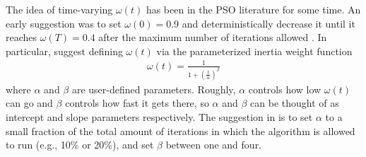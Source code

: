 \documentclass[12pt]{article}
\begin{document}
The idea of time-varying $\omega(t)$ has been in the PSO literature for some time. An early suggestion was to set $\omega(0)=0.9$ and deterministically decrease it until it reaches $\omega(T)=0.4$ after the maximum number of iterations allowed \citep{eberhart2000comparing}. In particular, \citet{tuppadung2011comparing} suggest defining $\omega(t)$ via the parameterized inertia weight function
\begin{align}\label{eq:inertiafun}
\omega(t) = \frac{1}{1 + \left(\frac{t}{\alpha}\right)^{\beta}}
\end{align}
where $\alpha$ and $\beta$ are user-defined parameters. Roughly, $\alpha$ controls how low $\omega(t)$ can go and $\beta$ controls how fast it gets there, so $\alpha$ and $\beta$ can be thought of as intercept and slope parameters respectively. The suggestion in \citet{tuppadung2011comparing} is to set $\alpha$ to a small fraction of the total amount of iterations in which the algorithm is allowed to run (e.g., 10\% or 20\%), and set $\beta$ between one and four.
\end{document}

